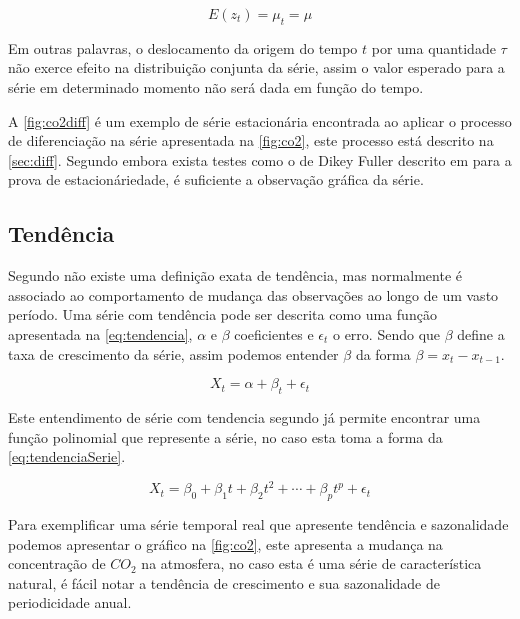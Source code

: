 \documentclass[
    12pt,
    oneside,
    a4paper,
    english,
    brazil
]{abntex2}
\begin{document}
\begin{equation}
    \label{eq:westacionaria}
    E(z_t) = \mu_t = \mu
\end{equation}

Em outras palavras, o deslocamento da origem do tempo $t$ por uma quantidade
$\tau$ não exerce efeito na distribuição conjunta da série, assim o valor
esperado para a série em determinado momento não será dada em função do tempo.




A \autoref{fig:co2diff} é um exemplo de série estacionária encontrada ao
aplicar o processo de diferenciação na série apresentada na \autoref{fig:co2},
este processo está descrito na \autoref{sec:diff}. Segundo
 embora exista testes como o de Dikey Fuller descrito em
 para a prova de estacionáriedade, é suficiente a observação
gráfica da série.

\subsection{Tendência}

Segundo  não existe uma definição exata de tendência, mas
normalmente é associado ao comportamento de mudança das observações ao longo de
um vasto período. Uma série com tendência pode ser descrita como uma função
apresentada na \autoref{eq:tendencia}, $\alpha$ e $\beta$ coeficientes e
$\epsilon_t$ o erro. Sendo que $\beta$ define a taxa de crescimento da série,
assim podemos entender $\beta$ da forma $\beta = x_t - x_{t-1}$.

\begin{equation}
    \label{eq:tendencia} X_t = \alpha + \beta_t + \epsilon_t
\end{equation}

Este entendimento de série com tendencia segundo  já permite
encontrar uma função polinomial que represente a série, no caso esta toma a
forma da \autoref{eq:tendenciaSerie}.

\begin{equation}
    \label{eq:tendenciaSerie}
    X_t = \beta_0 + \beta_1t + \beta_2t^2 + \cdots + \beta_{p}t^p + \epsilon_t
\end{equation}

Para exemplificar uma série temporal real que apresente tendência e
sazonalidade podemos apresentar o gráfico na \autoref{fig:co2}, este apresenta
a mudança na concentração de $CO_2$ na atmosfera, no caso esta é uma série de
característica natural, é fácil notar a tendência de crescimento e sua
sazonalidade de periodicidade anual.
\end{document}
